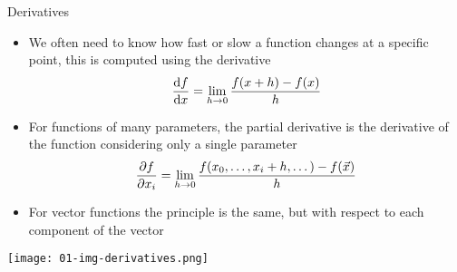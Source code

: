   \begin{frame}{Derivatives}
    \begin{itemize}
      \item We often need to know how fast or slow a function changes at a specific point, this is computed using the derivative
      \begin{equation*}
        \frac{\mathrm{d}f}{\mathrm{d}x} = \lim\limits_{h\rightarrow 0} \frac{f(x+h) - f(x)}{h}
      \end{equation*}
      \item For functions of many parameters, the partial derivative is the derivative of the function considering only a single parameter
      \begin{equation*}
        \frac{\partial f}{\partial x_i} = \lim\limits_{h\rightarrow 0}
          \frac{f(x_0, \dots, x_i+h, \dots) - f(\vec{x})}{h}
      \end{equation*}
    \item For vector functions the principle is the same, but with respect to each component of the vector
    \end{itemize}
    \texttt{[image: 01-img-derivatives.png]}
  \end{frame}

